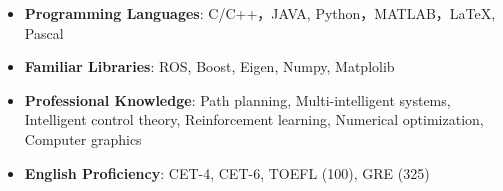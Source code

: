 \begin{itemize}[leftmargin=*]
  \item \textbf{Programming Languages}: C/C++，JAVA, Python，MATLAB，\LaTeX , Pascal
  \item \textbf{Familiar Libraries}: ROS, Boost, Eigen, Numpy, Matplolib
  \item \textbf{Professional Knowledge}: Path planning, Multi-intelligent systems, Intelligent control theory, Reinforcement learning, Numerical optimization, Computer graphics
  \item \textbf{English Proficiency}: CET-4, CET-6, TOEFL (100), GRE (325)
\end{itemize}